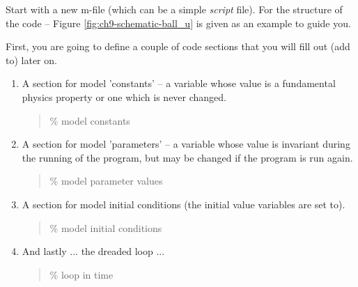 \documentclass{tufte-book} %
\newenvironment{docspec}{\begin{quotation}\ttfamily\parskip0pt\parindent0pt\ignorespaces}{\end{quotation}}
\begin{document}
 Start with a new \textsf{m-file} (which can be a simple \textit{script} file). For the structure of the code -- Figure \ref{fig:ch9-schematic-ball_u} is given as an example to guide you. 

First, you are going to define a couple of code sections that you will fill out (add to) later on. 

\begin{enumerate}[noitemsep]

\vspace{1mm}
\item A section for model 'constants' -- a variable whose value is a fundamental physics property or one which is never changed.
\begin{docspec}
\textcolor[rgb]{0,0.501961,0}{\% model constants}\\
\end{docspec}

\vspace{1mm}
\item A section for model 'parameters' -- a variable whose value is invariant during the running of the program, but may be changed if the program is run again.
\begin{docspec}
\textcolor[rgb]{0,0.501961,0}{\% model parameter values}\\
\end{docspec}

\vspace{1mm}
\item A section for model initial conditions (the initial value variables are set to).
\begin{docspec}
\textcolor[rgb]{0,0.501961,0}{\% model initial conditions}\\
\end{docspec}

\vspace{1mm}
\item And lastly ... the dreaded loop ...
\begin{docspec}
\textcolor[rgb]{0,0.501961,0}{\% loop in time}\\
\end{docspec}

\end{enumerate}
\end{document}
